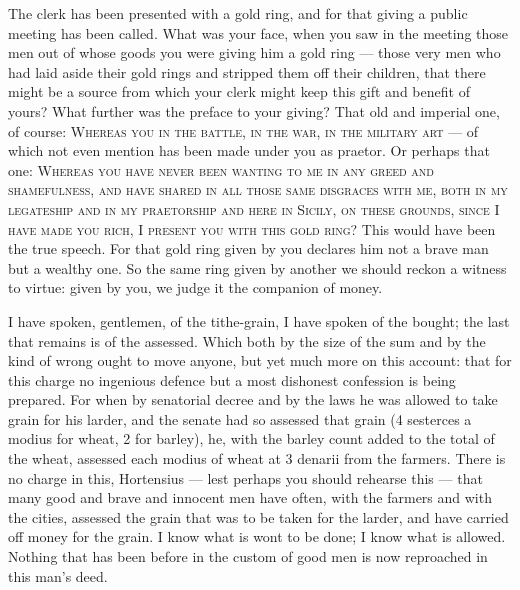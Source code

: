  The clerk has been presented with a gold ring, and for that giving a public meeting has been called. What was your face, when you saw in the meeting those men out of whose goods you were giving him a gold ring --- those very men who had laid aside their gold rings and stripped them off their children, that there might be a source from which your clerk might keep this gift and benefit of yours? What further was the preface to your giving? That old and imperial one, of course: \textsc{Whereas you in the battle, in the war, in the military art} --- of which not even mention has been made under you as praetor. Or perhaps that one: \textsc{Whereas you have never been wanting to me in any greed and shamefulness, and have shared in all those same disgraces with me, both in my legateship and in my praetorship and here in Sicily, on these grounds, since I have made you rich, I present you with this gold ring}? This would have been the true speech. For that gold ring given by you declares him not a brave man but a wealthy one. So the same ring given by another we should reckon a witness to virtue: given by you, we judge it the companion of money.

 I have spoken, gentlemen, of the tithe-grain, I have spoken of the bought; the last that remains is of the assessed. Which both by the size of the sum and by the kind of wrong ought to move anyone, but yet much more on this account: that for this charge no ingenious defence but a most dishonest confession is being prepared. For when by senatorial decree and by the laws he was allowed to take grain for his larder, and the senate had so assessed that grain (4 sesterces a modius for wheat, 2 for barley), he, with the barley count added to the total of the wheat, assessed each modius of wheat at 3 denarii from the farmers. There is no charge in this, Hortensius --- lest perhaps you should rehearse this --- that many good and brave and innocent men have often, with the farmers and with the cities, assessed the grain that was to be taken for the larder, and have carried off money for the grain. I know what is wont to be done; I know what is allowed. Nothing that has been before in the custom of good men is now reproached in this man's deed.

